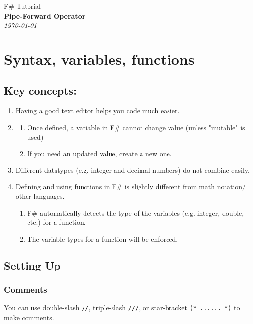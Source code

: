 \documentclass[12pt]{article}
\begin{document}
\begin{center}

{\large F\# Tutorial\\} \vspace{2mm}
\textbf{\LARGE Pipe-Forward Operator}\\
\vspace{1.5mm}
{\Large\emph{\today}}

\end{center}


\section{Syntax, variables, functions}

\subsection*{Key concepts: } 

\begin{enumerate}
\item Having a good text editor helps you code much easier.
\item 
\begin{enumerate}
\item Once defined, a variable in F\# cannot change value (unless "mutable" is used)
\item If you need an updated value, create a new one.
\end{enumerate}
\item Different datatypes (e.g. integer and decimal-numbers) do not combine easily.
\item Defining and using functions in F\# is slightly different from math notation/ other languages.
\begin{enumerate}
\item F\# automatically detects the type of the variables (e.g. integer, double, etc.) for a function.
\item The variable types for a function will be enforced.
\end{enumerate}
\end{enumerate}

\subsection{Setting Up} 
\subsubsection{Comments}
You can use double-slash \texttt{//}, triple-slash \texttt{///}, or star-bracket \texttt{(* ...... *)} to make comments.
\end{document}
